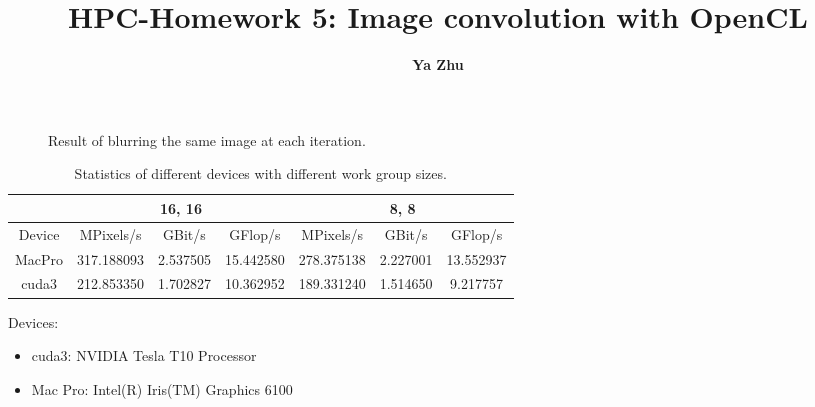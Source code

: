 \documentclass[11pt, oneside]{article}   	%
\title{\bf HPC-Homework 5: Image convolution with OpenCL}
\author{\bf \large Ya Zhu}
\date{}							%
\begin{document}
\maketitle 
\section{}
\begin{figure}[ht]\label{fig:1}
\centering
{}
\caption{Result of blurring the same image at each iteration.}
\end{figure}
\begin{table}[h]
\centering
\caption{Statistics of different devices with different work group sizes.}
\label{tbl:1}
\begin{tabular}{|c|c|c|c|c|c|c|}
\hline
       & \multicolumn{3}{c|}{16, 16} & \multicolumn{3}{c|}{8, 8} \\ \hline
Device &    MPixels/s     &   GBit/s      &   GFlop/s      &    MPixels/s     &  GBit/s      &   GFlop/s     \\ \hline
MacPro &    317.188093     &    2.537505     &    15.442580     &    278.375138     &    2.227001    &  13.552937      \\ \hline
cuda3  &    212.853350     &   1.702827      &   10.362952      &  189.331240       &   1.514650     &   9.217757     \\ \hline
\end{tabular}
\end{table}
Devices:
\begin{itemize}
\item cuda3: NVIDIA Tesla T10 Processor
\item Mac Pro: Intel(R) Iris(TM) Graphics 6100
\end{itemize}
\end{document}
